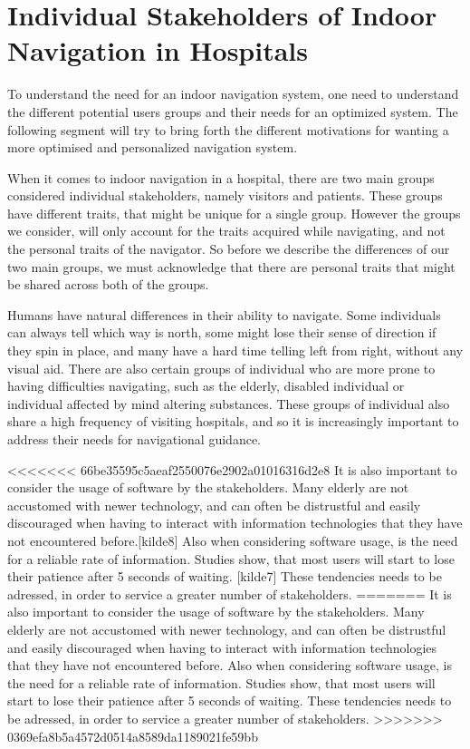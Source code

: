 \section{Individual Stakeholders of Indoor Navigation in Hospitals} %
\label{sec:interusers}


To understand the need for an indoor navigation system, one need to understand the different potential users groups and their needs for an optimized system. The following segment will try to bring forth the different motivations for wanting a more optimised and personalized navigation system.

When it comes to indoor navigation in a hospital, there are two main groups considered individual stakeholders, namely visitors and patients. These groups have different traits, that might be unique for a single group. However the groups we consider, will only account for the traits acquired while navigating, and not the personal traits of the navigator. So before we describe the differences of our two main groups, we must acknowledge that there are personal traits that might be shared across both of the groups.

Humans have natural differences in their ability to navigate. Some individuals can always tell which way is north, some might lose their sense of direction if they spin in place, and many have a hard time telling left from right, without any visual aid.\cite{naturtalenter} There are also certain groups of individual who are more prone to having difficulties navigating, such as the elderly, disabled individual or individual affected by mind altering substances.\cite{MCI} These groups of individual also share a high frequency of visiting hospitals, and so it is increasingly important to address their needs for navigational guidance.\cite{generel}

<<<<<<< 66be35595c5aeaf2550076e2902a01016316d2e8
It is also important to consider the usage of software by the stakeholders. Many elderly are not accustomed with newer technology, and can often be distrustful and easily discouraged when having to interact with information technologies that they have not encountered before.[kilde8] Also when considering software usage, is the need for a reliable rate of information. Studies show, that most users will start to lose their patience after 5 seconds of waiting. [kilde7] These tendencies needs to be adressed, in order to service a greater number of stakeholders.
=======
It is also important to consider the usage of software by the stakeholders. Many elderly are not accustomed with newer technology, and can often be distrustful and easily discouraged when having to interact with information technologies that they have not encountered before.\cite{gamle_teknologi} Also when considering software usage, is the need for a reliable rate of information. Studies show, that most users will start to lose their patience after 5 seconds of waiting. \cite{ventetid} These tendencies needs to be adressed, in order to service a greater number of stakeholders.
>>>>>>> 0369efa8b5a4572d0514a8589da1189021fe59bb

